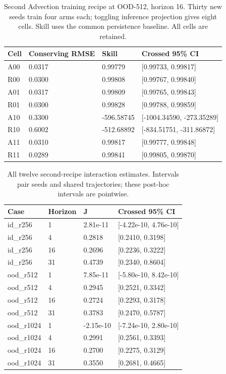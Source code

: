 \begin{table}[H]
\centering
\small
\setlength{\tabcolsep}{3pt}
\begin{tabular}{llll}
\toprule
Cell & Conserving RMSE & Skill & Crossed 95\% CI \\\midrule
A00 & 0.0317 & 0.99779 & [0.99733, 0.99817] \\
R00 & 0.0300 & 0.99808 & [0.99767, 0.99840] \\
A01 & 0.0317 & 0.99809 & [0.99765, 0.99843] \\
R01 & 0.0300 & 0.99828 & [0.99788, 0.99859] \\
A10 & 0.3300 & -596.58745 & [-1004.34590, -273.35289] \\
R10 & 0.6002 & -512.68892 & [-834.51751, -311.86872] \\
A11 & 0.0310 & 0.99817 & [0.99777, 0.99848] \\
R11 & 0.0289 & 0.99841 & [0.99805, 0.99870] \\
\bottomrule
\end{tabular}
\caption{Second Advection training recipe at OOD-512, horizon 16. Thirty new seeds train four arms each; toggling inference projection gives eight cells. Skill uses the common persistence baseline. All cells are retained.}
\label{tab:recipe-cells}
\end{table}
\begin{table}[H]
\centering
\small
\setlength{\tabcolsep}{3pt}
\begin{tabular}{llll}
\toprule
Case & Horizon & J & Crossed 95\% CI \\\midrule
id\_r256 & 1 & 2.81e-11 & [-4.22e-10, 4.76e-10] \\
id\_r256 & 4 & 0.2818 & [0.2410, 0.3198] \\
id\_r256 & 16 & 0.2696 & [0.2236, 0.3222] \\
id\_r256 & 31 & 0.4739 & [0.2340, 0.8604] \\
ood\_r512 & 1 & 7.85e-11 & [-5.80e-10, 8.42e-10] \\
ood\_r512 & 4 & 0.2945 & [0.2521, 0.3342] \\
ood\_r512 & 16 & 0.2724 & [0.2293, 0.3178] \\
ood\_r512 & 31 & 0.3783 & [0.2470, 0.5787] \\
ood\_r1024 & 1 & -2.15e-10 & [-7.24e-10, 2.80e-10] \\
ood\_r1024 & 4 & 0.2991 & [0.2561, 0.3393] \\
ood\_r1024 & 16 & 0.2700 & [0.2275, 0.3129] \\
ood\_r1024 & 31 & 0.3550 & [0.2681, 0.4665] \\
\bottomrule
\end{tabular}
\caption{All twelve second-recipe interaction estimates. Intervals pair seeds and shared trajectories; these post-hoc intervals are pointwise.}
\label{tab:recipe-interactions}
\end{table}
